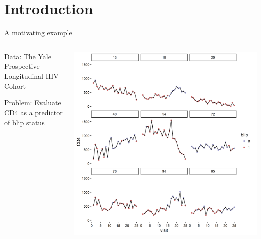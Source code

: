 \documentclass{beamer}
\begin{document}





\section{Introduction}
\begin{frame}
  \centering
  A motivating example
  \medskip
  \begin{columns}
    \begin{column}{.3\textwidth}
      Data: The Yale Prospective Longitudinal HIV Cohort
      \vspace{.2in}
      
      Problem: Evaluate CD4 as a predictor of blip status
    \end{column}
    \begin{column}{.7\textwidth}
      \includegraphics[width=\textwidth]{fig5.png}
    \end{column}
  \end{columns}
  
\end{frame}
\end{document}

